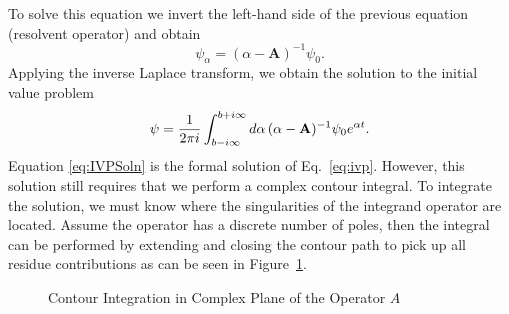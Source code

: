 To solve this equation we invert the left-hand side of the previous equation (resolvent operator) and obtain
\begin{equation}
	\psi_{\alpha} = (\alpha - \mathbf{A})^{-1}\psi_{0}.
\end{equation}
Applying the inverse Laplace transform, we obtain the solution to the initial value problem
\begin{equation}
	\psi = \frac{1}{2\pi i} \int_{b - i\infty}^{b + i\infty} \mathop{}\!d \alpha \, (\alpha - \mathbf{A})^{-1}\psi_{0} e^{\alpha t}.
	\label{eq:IVPSoln}
\end{equation}
Equation \ref{eq:IVPSoln} is the formal solution of Eq.~\ref{eq:ivp}. However, this solution still requires that we perform a complex contour integral. To integrate the solution, we must know where the singularities of the integrand operator are located. Assume the operator has a discrete number of poles, then the integral can be performed by extending and closing the contour path to pick up all residue contributions as can be seen in Figure~\ref{fig:Contour}.

\begin{figure}
\centering
\resizebox{0.5\textwidth}{!}{
}
\caption{Contour Integration in Complex Plane of the Operator $A$}
\label{fig:Contour}
\end{figure}

